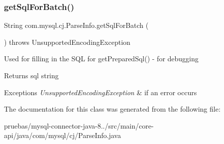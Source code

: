 \subsubsection{\texorpdfstring{get\+Sql\+For\+Batch()}{getSqlForBatch()}\hspace{0.1cm}{\footnotesize\ttfamily [2/2]}}
{\footnotesize\ttfamily String com.\+mysql.\+cj.\+Parse\+Info.\+get\+Sql\+For\+Batch (\begin{DoxyParamCaption}{ }\end{DoxyParamCaption}) throws Unsupported\+Encoding\+Exception}

Used for filling in the S\+QL for get\+Prepared\+Sql() -\/ for debugging

\begin{DoxyReturn}{Returns}
sql string 
\end{DoxyReturn}

\begin{DoxyExceptions}{Exceptions}
{\em Unsupported\+Encoding\+Exception} & if an error occurs \\
\hline
\end{DoxyExceptions}


The documentation for this class was generated from the following file\+:\begin{DoxyCompactItemize}
\item 
pruebas/mysql-\/connector-\/java-\/8../src/main/core-\/api/java/com/mysql/cj/Parse\+Info.\+java\end{DoxyCompactItemize}
